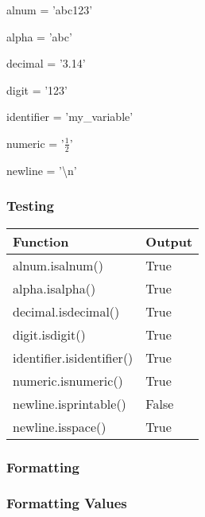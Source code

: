 \documentclass{beamer}
\begin{document}
%
%
\begin{frame}
  alnum = 'abc123'

  alpha = 'abc'

  decimal = '3.14'

  digit = '123'

  identifier = 'my\text_variable'

  numeric = '$\frac{1}{2}$'

  newline = '\textbackslash n'
  \frametitle{Testing}
  \begin{table}
    \begin{tabular}{l | l}
    Function & Output \\
    \hline
    alnum.isalnum() & True \\
    alpha.isalpha() & True \\
    decimal.isdecimal() & True \\
    digit.isdigit() & True \\
    identifier.isidentifier() & True \\
    numeric.isnumeric() & True \\
    newline.isprintable() & False \\
    newline.isspace() & True 
   \end{tabular}
  \end{table}
\end{frame}


%
%
%
\begin{frame}
  \frametitle{Formatting}
\end{frame}

%
%
\begin{frame}
  \frametitle{Formatting Values} 
\end{frame}
\end{document}

